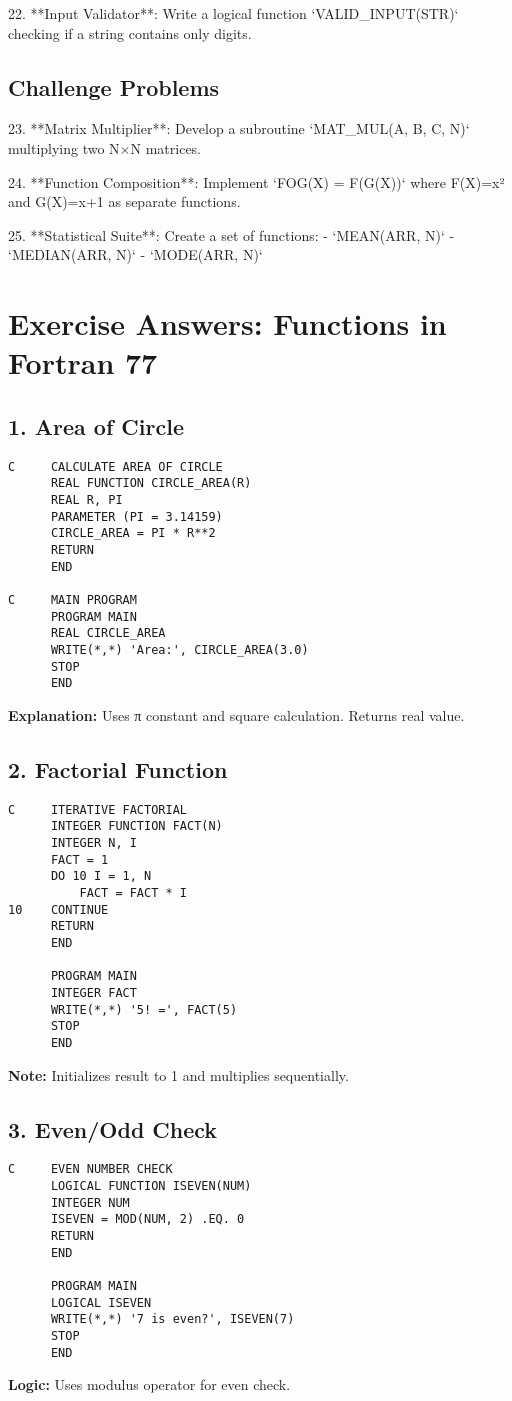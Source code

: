 \documentclass{book}
\begin{document}
22. **Input Validator**:  
Write a logical function `VALID_INPUT(STR)` checking if a string contains only digits.  

\subsection*{Challenge Problems}  
23. **Matrix Multiplier**:  
Develop a subroutine `MAT_MUL(A, B, C, N)` multiplying two N×N matrices.  

24. **Function Composition**:  
Implement `FOG(X) = F(G(X))` where F(X)=x² and G(X)=x+1 as separate functions.  

25. **Statistical Suite**:  
Create a set of functions:  
- `MEAN(ARR, N)`  
- `MEDIAN(ARR, N)`  
- `MODE(ARR, N)`  

\section{Exercise Answers: Functions in Fortran 77}

\subsection*{1. Area of Circle}
\begin{verbatim}
C     CALCULATE AREA OF CIRCLE
      REAL FUNCTION CIRCLE_AREA(R)
      REAL R, PI
      PARAMETER (PI = 3.14159)
      CIRCLE_AREA = PI * R**2
      RETURN
      END

C     MAIN PROGRAM
      PROGRAM MAIN
      REAL CIRCLE_AREA
      WRITE(*,*) 'Area:', CIRCLE_AREA(3.0)
      STOP
      END
\end{verbatim}
\textbf{Explanation:} Uses π constant and square calculation. Returns real value.

\subsection*{2. Factorial Function}
\begin{verbatim}
C     ITERATIVE FACTORIAL
      INTEGER FUNCTION FACT(N)
      INTEGER N, I
      FACT = 1
      DO 10 I = 1, N
          FACT = FACT * I
10    CONTINUE
      RETURN
      END

      PROGRAM MAIN
      INTEGER FACT
      WRITE(*,*) '5! =', FACT(5)
      STOP
      END
\end{verbatim}
\textbf{Note:} Initializes result to 1 and multiplies sequentially.

\subsection*{3. Even/Odd Check}
\begin{verbatim}
C     EVEN NUMBER CHECK
      LOGICAL FUNCTION ISEVEN(NUM)
      INTEGER NUM
      ISEVEN = MOD(NUM, 2) .EQ. 0
      RETURN
      END

      PROGRAM MAIN
      LOGICAL ISEVEN
      WRITE(*,*) '7 is even?', ISEVEN(7)
      STOP
      END
\end{verbatim}
\textbf{Logic:} Uses modulus operator for even check.
\end{document}
